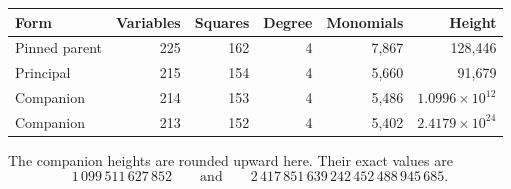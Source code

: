\begin{center}
\small
\begin{tabular}{@{}lrrrrr@{}}
\toprule Form & Variables & Squares & Degree & Monomials & Height\\\midrule
Pinned parent & 225 & 162 & 4 & 7,867 & 128,446\\
Principal & 215 & 154 & 4 & 5,660 & 91,679\\
Companion & 214 & 153 & 4 & 5,486 & $1.0996\times10^{12}$\\
Companion & 213 & 152 & 4 & 5,402 & $2.4179\times10^{24}$\\
\bottomrule
\end{tabular}
\end{center}
The companion heights are rounded upward here. Their exact values are
\[1\,099\,511\,627\,852\qquad\text{and}\qquad2\,417\,851\,639\,242\,452\,488\,945\,685.\]
